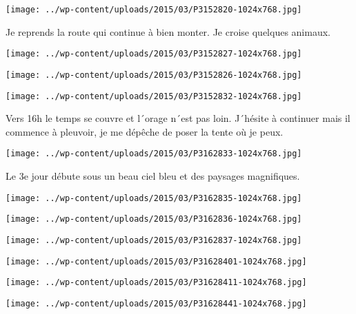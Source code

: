  \newline
\centerline{\texttt{[image: ../wp-content/uploads/2015/03/P3152820-1024x768.jpg]} } 
 \newline
 Je reprends la route qui continue à bien monter. Je croise quelques animaux. \newline
 \newline
\centerline{\texttt{[image: ../wp-content/uploads/2015/03/P3152827-1024x768.jpg]} } 
 \newline
 \newline
\centerline{\texttt{[image: ../wp-content/uploads/2015/03/P3152826-1024x768.jpg]} } 
 \newline
 \newline
\centerline{\texttt{[image: ../wp-content/uploads/2015/03/P3152832-1024x768.jpg]} } 
 \newline
 Vers 16h le temps se couvre et l´orage n´est pas loin. J´hésite à continuer mais il commence à pleuvoir, je me dépêche de poser la tente où je peux. \newline
 \newline
\centerline{\texttt{[image: ../wp-content/uploads/2015/03/P3162833-1024x768.jpg]} } 
 \newline
 Le 3e jour débute sous un beau ciel bleu et des paysages magnifiques. \newline
 \newline
\centerline{\texttt{[image: ../wp-content/uploads/2015/03/P3162835-1024x768.jpg]} } 
 \newline
 \newline
\centerline{\texttt{[image: ../wp-content/uploads/2015/03/P3162836-1024x768.jpg]} } 
 \newline
 \newline
\centerline{\texttt{[image: ../wp-content/uploads/2015/03/P3162837-1024x768.jpg]} } 
 \newline
 \newline
\centerline{\texttt{[image: ../wp-content/uploads/2015/03/P31628401-1024x768.jpg]} } 
 \newline
 \newline
\centerline{\texttt{[image: ../wp-content/uploads/2015/03/P31628411-1024x768.jpg]} } 
 \newline
 \newline
\centerline{\texttt{[image: ../wp-content/uploads/2015/03/P31628441-1024x768.jpg]} } 
